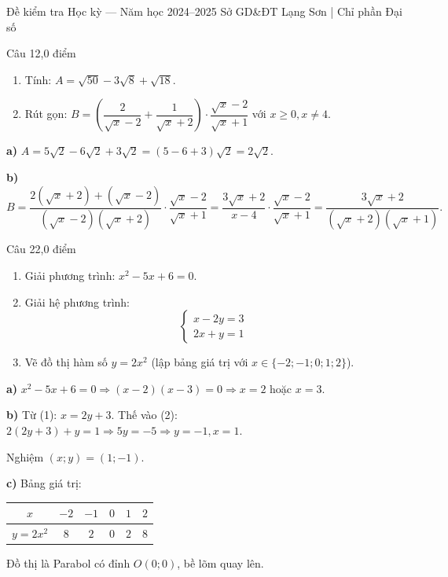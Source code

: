 ﻿%
%
  {Đề kiểm tra Học kỳ — Năm học 2024--2025}%
  {Sở GD\&ĐT Lạng Sơn | Chỉ phần Đại số}

\begin{de_cau}{Câu 1}{2,0 điểm}
\begin{enumerate}[label=\alph*)]
\item Tính: $A = \sqrt{50} - 3\sqrt{8} + \sqrt{18}$.
\item Rút gọn: $B = \left(\dfrac{2}{\sqrt{x}-2}+\dfrac{1}{\sqrt{x}+2}\right)\cdot\dfrac{\sqrt{x}-2}{\sqrt{x}+1}$ với $x\geq 0, x\neq 4$.
\end{enumerate}
\end{de_cau}

\begin{loi_giai_cau}
\textbf{a)} $A = 5\sqrt{2}-6\sqrt{2}+3\sqrt{2} = (5-6+3)\sqrt{2} = \boxed{2\sqrt{2}}$.

\textbf{b)}
\[B = \frac{2(\sqrt{x}+2)+(\sqrt{x}-2)}{(\sqrt{x}-2)(\sqrt{x}+2)}\cdot\frac{\sqrt{x}-2}{\sqrt{x}+1}
= \frac{3\sqrt{x}+2}{x-4}\cdot\frac{\sqrt{x}-2}{\sqrt{x}+1}
= \frac{3\sqrt{x}+2}{(\sqrt{x}+2)(\sqrt{x}+1)}.\]
\end{loi_giai_cau}

\begin{de_cau}{Câu 2}{2,0 điểm}
\begin{enumerate}[label=\alph*)]
\item Giải phương trình: $x^2 - 5x + 6 = 0$.
\item Giải hệ phương trình: 
\[ \begin{cases} x - 2y = 3 \\ 2x + y = 1 \end{cases} \]
\item Vẽ đồ thị hàm số $y = 2x^2$ (lập bảng giá trị với $x\in\{-2;-1;0;1;2\}$).
\end{enumerate}
\end{de_cau}

\begin{loi_giai_cau}
\textbf{a)} $x^2-5x+6=0\Rightarrow(x-2)(x-3)=0\Rightarrow x=2$ hoặc $x=3$.

\textbf{b)} Từ (1): $x=2y+3$. Thế vào (2): $2(2y+3)+y=1\Rightarrow 5y=-5\Rightarrow y=-1, x=1$.

Nghiệm $(x;y)=(1;-1)$.

\textbf{c)} Bảng giá trị:
\begin{center}
\begin{tabular}{c|ccccc}$x$&$-2$&$-1$&$0$&$1$&$2$\\\hline$y=2x^2$&$8$&$2$&$0$&$2$&$8$\end{tabular}
\end{center}
Đồ thị là Parabol có đỉnh $O(0;0)$, bề lõm quay lên.
\end{loi_giai_cau}

